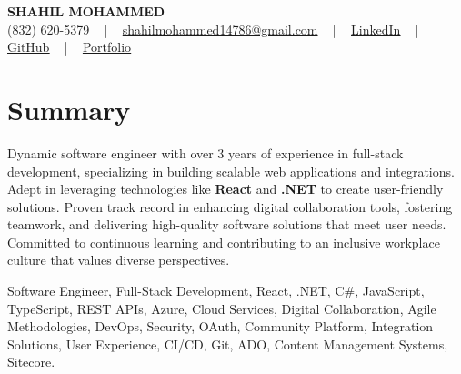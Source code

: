 \documentclass[letterpaper,10pt]{article}
\begin{document}
\begin{center}
    {\fontsize{14pt}{12pt}\selectfont \textbf{\MakeUppercase{Shahil Mohammed}}}\\ \vspace{2pt}
    \fontsize{10pt}{12pt}\selectfont (832) 620-5379 ~ | ~ \href{mailto:shahilmohammed14786@gmail.com}{shahilmohammed14786@gmail.com} ~ | ~  
    \href{https://www.linkedin.com/in/shahil-mohammed-9652931a1/}{\color{blue}\underline{LinkedIn}}  ~ | ~ 
    \href{https://github.com/freakbeast14}{\color{blue}\underline{GitHub}} ~ | ~ 
    \href{https://shahil-mohammed.netlify.app/}{\color{blue}\underline{Portfolio}}
    \vspace{-8pt}
\end{center}

\section{Summary}
\vspace{-2pt}\fontsize{8pt}{9pt}\selectfont
Dynamic software engineer with over 3 years of experience in full-stack development, specializing in building scalable web applications and integrations. Adept in leveraging technologies like \textbf{React} and \textbf{.NET} to create user-friendly solutions. Proven track record in enhancing digital collaboration tools, fostering teamwork, and delivering high-quality software solutions that meet user needs. Committed to continuous learning and contributing to an inclusive workplace culture that values diverse perspectives.
 \vspace{-5pt}
 
{\fontsize{1pt}{1pt}\selectfont\color{white}
Software Engineer, Full-Stack Development, React, .NET, C#, JavaScript, TypeScript, REST APIs, Azure, Cloud Services, Digital Collaboration, Agile Methodologies, DevOps, Security, OAuth, Community Platform, Integration Solutions, User Experience, CI/CD, Git, ADO, Content Management Systems, Sitecore.
}
\vspace{-8pt}

\vspace{-2pt}
\end{document}
